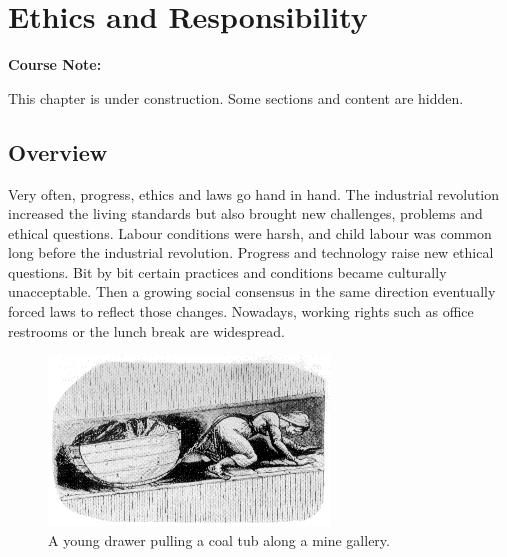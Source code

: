 \documentclass[
]{book}
\begin{document}
\hypertarget{ethics-and-responsibility}{%
\chapter{Ethics and Responsibility}\label{ethics-and-responsibility}}

\begin{notebox}

\begin{center}
\textbf{Course Note:}

\end{center}

This chapter is under construction. Some sections and content are hidden.

\end{notebox}

\hypertarget{overview-2}{%
\section{Overview}\label{overview-2}}

Very often, progress, ethics and laws go hand in hand. The industrial revolution increased the living standards but also brought new challenges, problems and ethical questions. Labour conditions were harsh, and child labour was common long before the industrial revolution. Progress and technology raise new ethical questions. Bit by bit certain practices and conditions became culturally unacceptable. Then a growing social consensus in the same direction eventually forced laws to reflect those changes. Nowadays, working rights such as office restrooms or the lunch break are widespread.

\begin{figure}

{\centering \includegraphics[width=0.25\linewidth]{Figures/coaltub} 

}

\caption{A young drawer pulling a coal tub along a mine gallery.}\label{fig:coaltub}
\end{figure}
\end{document}
